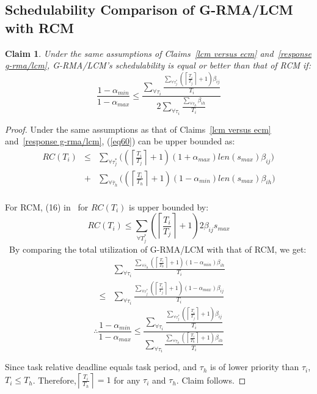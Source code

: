 \documentclass[conference]{IEEEtran}
\newtheorem{clm}{Claim}
\begin{document}
\subsection{Schedulability Comparison of G-RMA/LCM with RCM}
\label{rma eval}

\begin{clm}
Under the same assumptions of Claims~\ref{lcm versus ecm} and~\ref{response g-rma/lcm}, G-RMA/LCM's schedulability is equal or better than that of RCM if:
\begin{equation}
\frac{1-\alpha_{min}}{1-\alpha_{max}}\le\frac{\sum_{\forall \tau_{i}}\frac{\sum_{\forall \tau_{j}^{*}}\left(\left\lceil\frac{T_{i}}{T_{j}}\right\rceil+1\right)\beta_{ij}}{T_{i}}}{2\sum_{\forall \tau_{i}}\frac{\sum_{\forall\bar{\tau}_{h}}\beta_{ih}}{T_{i}}}\label{eq70}\end{equation}
\end{clm}
%
\begin{proof}
Under the same assumptions as that of Claims~\ref{lcm versus ecm} and~\ref{response g-rma/lcm}, (\ref{eq60}) can be upper bounded as:
\begin{eqnarray}
RC(T_i) & \le & \sum_{\forall \tau_{j}^{*}}\bigg(\left(\left\lceil\frac{T_{i}}{T_{j}}\right\rceil +1\right)(1+\alpha_{max})
 len(s_{max})\beta_{ij}\bigg)\nonumber\\
 & + & \sum_{\forall\bar{\tau}_{h}}\bigg(\left(\left\lceil\frac{T_{i}}{T_{h}}\right\rceil+1\right)(1-\alpha_{min})
 len(s_{max})\beta_{ih}\bigg)\nonumber\\
 \label{eq68}\end{eqnarray}
 
For RCM, (16) in~\cite{stmconcurrencycontrol:emsoft11} for $RC(T_{i})$ is upper bounded by:
\begin{equation*}
RC(T_{i})\le\sum_{\forall T_{j}^{*}}\left(\left\lceil\frac{T_{i}}{T_{j}}\right\rceil +1\right)2\beta_{ij}s_{max}\label{eq69}\end{equation*}\
By comparing the total utilization of G-RMA/LCM with that of RCM,
we get:
\begin{eqnarray*}
& & \sum_{\forall \tau_{i}}\frac{\sum_{\forall\bar{\tau}_{h}}\left(\left\lceil\frac{T_{i}}{T_{h}}\right\rceil+1\right)(1-\alpha_{min})\beta_{ih}}{T_{i}}\\
& \le &
\sum_{\forall \tau_{i}}\frac{\sum_{\forall \tau_{j}^{*}}\left(\left\lceil\frac{T_{i}}{T_{j}}\right\rceil+1\right)(1-\alpha_{max})\beta_{ij}}{T_{i}}
\end{eqnarray*}
\begin{equation*}
\therefore\frac{1-\alpha_{min}}{1-\alpha_{max}}  \le  \frac{\sum_{\forall \tau_{i}}\frac{\sum_{\forall \tau_{j}^{*}}\left(\left\lceil\frac{T_{i}}{T_{j}}\right\rceil+1\right)\beta_{ij}}{T_{i}}}{\sum_{\forall \tau_{i}}\frac{\sum_{\forall\bar{\tau}_{h}}\left(\left\lceil\frac{T_{i}}{T_{h}}\right\rceil+1\right)\beta_{ih}}{T_{i}}}\end{equation*}

Since task relative deadline equals task period, and $\tau_{h}$ is of lower priority than $\tau_{i}$, $T_{i}\le T_{h}$. Therefore,$\left\lceil\frac{T_{i}}{T_{h}}\right\rceil=1$ for any $\tau_{i}$ and $\tau_{h}$. 
Claim follows.
\end{proof}
\end{document}
